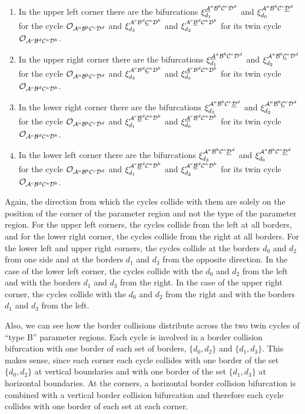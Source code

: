 \begin{enumerate}
	\item In the upper left corner there are the bifurcations $\xi_{d_1}^{\underline{\mathcal{A}}^a\mathcal{B}^b\mathcal{C}^c\mathcal{D}^d}$ and $\xi_{d_0}^{\mathcal{A}^a\mathcal{B}^b\mathcal{C}^c\underline{\mathcal{D}}^d}$ for the cycle $\mathcal{O}_{\mathcal{A}^a\mathcal{B}^b\mathcal{C}^c\mathcal{D}^d}$ and $\xi_{d_3}^{\mathcal{A}^c\mathcal{B}^d\underline{\mathcal{C}}^a\mathcal{D}^b}$ and $\xi_{d_2}^{\mathcal{A}^c\underline{\mathcal{B}}^d\mathcal{C}^a\mathcal{D}^b}$ for its twin cycle $\mathcal{O}_{\mathcal{A}^c\mathcal{B}^d\mathcal{C}^a\mathcal{D}^b}$.
	\item In the upper right corner there are the bifurcations $\xi_{d_1}^{\underline{\mathcal{A}}^a\mathcal{B}^b\mathcal{C}^c\mathcal{D}^d}$ and $\xi_{d_2}^{\mathcal{A}^a\mathcal{B}^b\underline{\mathcal{C}}^c\mathcal{D}^d}$ for the cycle $\mathcal{O}_{\mathcal{A}^a\mathcal{B}^b\mathcal{C}^c\mathcal{D}^d}$ and $\xi_{d_3}^{\mathcal{A}^c\mathcal{B}^d\underline{\mathcal{C}}^a\mathcal{D}^b}$ and $\xi_{d_0}^{\underline{\mathcal{A}}^c\mathcal{B}^d\mathcal{C}^a\mathcal{D}^b}$ for its twin cycle $\mathcal{O}_{\mathcal{A}^c\mathcal{B}^d\mathcal{C}^a\mathcal{D}^b}$.
	\item In the lower right corner there are the bifurcations $\xi_{d_3}^{\mathcal{A}^a\mathcal{B}^b\mathcal{C}^c\underline{\mathcal{D}}^d}$ and $\xi_{d_2}^{\mathcal{A}^a\mathcal{B}^b\underline{\mathcal{C}}^c\mathcal{D}^d}$ for the cycle $\mathcal{O}_{\mathcal{A}^a\mathcal{B}^b\mathcal{C}^c\mathcal{D}^d}$ and $\xi_{d_1}^{\mathcal{A}^c\underline{\mathcal{B}}^d\mathcal{C}^a\mathcal{D}^b}$ and $\xi_{d_0}^{\underline{\mathcal{A}}^c\mathcal{B}^d\mathcal{C}^a\mathcal{D}^b}$ for its twin cycle $\mathcal{O}_{\mathcal{A}^c\mathcal{B}^d\mathcal{C}^a\mathcal{D}^b}$.
	\item In the lower left corner there are the bifurcations $\xi_{d_3}^{\mathcal{A}^a\mathcal{B}^b\mathcal{C}^c\underline{\mathcal{D}}^d}$ and $\xi_{d_0}^{\mathcal{A}^a\mathcal{B}^b\mathcal{C}^c\underline{\mathcal{D}}^d}$ for the cycle $\mathcal{O}_{\mathcal{A}^a\mathcal{B}^b\mathcal{C}^c\mathcal{D}^d}$ and $\xi_{d_1}^{\mathcal{A}^c\underline{\mathcal{B}}^d\mathcal{C}^a\mathcal{D}^b}$ and $\xi_{d_2}^{\mathcal{A}^c\underline{\mathcal{B}}^d\mathcal{C}^a\mathcal{D}^b}$ for its twin cycle $\mathcal{O}_{\mathcal{A}^c\mathcal{B}^d\mathcal{C}^a\mathcal{D}^b}$.
\end{enumerate}

Again, the direction from which the cycles collide with them are solely on the position of the corner of the parameter region and not the type of the parameter region.
For the upper left corners, the cycles collide from the left at all borders, and for the lower right corner, the cycles collide from the right at all borders.
For the lower left and upper right corners, the cycles collide at the borders $d_0$ and $d_2$ from one side and at the borders $d_1$ and $d_3$ from the opposite direction.
In the case of the lower left corner, the cycles collide with the $d_0$ and $d_2$ from the left and with the borders $d_1$ and $d_3$ from the right.
In the case of the upper right corner, the cycles collide with the $d_0$ and $d_2$ from the right and with the borders $d_1$ and $d_3$ from the left.

Also, we can see how the border collisions distribute across the two twin cycles of ``type B'' parameter regions.
Each cycle is involved in a border collision bifurcation with one border of each set of borders, $\{d_0, d_2\}$ and $\{d_1, d_3\}$.
This makes sense, since each corner each cycle collides with one border of the set $\{d_0, d_2\}$ at vertical boundaries and with one border of the set $\{d_1, d_3\}$ at horizontal boundaries.
At the corners, a horizontal border collision bifurcation is combined with a vertical border collision bifurcation and therefore each cycle collides with one border of each set at each corner.
